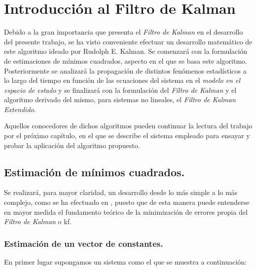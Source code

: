 \chapter{Introducción al Filtro de Kalman}

Debido a la gran importancia que presenta el \emph{Filtro de Kalman} en el desarrollo del presente trabajo, se ha visto conveniente efectuar un desarrollo matemático de este algoritmo ideado por Rudolph E. Kalman. Se comenzará con la formulación de estimaciones de mínimos cuadrados, aspecto en el que se basa este algoritmo. Posteriormente se analizará la propagación de distintos fenómenos estadísticos a lo largo del tiempo en función de las ecuaciones del sistema en el \emph{modelo en el espacio de estado} y se finalizará con la formulación del \emph{Filtro de Kalman} y el algoritmo derivado del mismo, para sistemas no lineales, el \emph{Filtro de Kalman Extendido}. \par 

Aquellos conocedores de dichos algoritmos pueden continuar la lectura del trabajo por el próximo capítulo, en el que se describe el sistema empleado para ensayar y probar la aplicación del algoritmo propuesto. \par 

\newpage
\section{Estimación de mínimos cuadrados.}

Se realizará, para mayor claridad, un desarrollo desde lo más simple a lo más complejo, como se ha efectuado en \cite{simon2006optimal}, puesto que de esta manera puede entenderse en mayor medida el fundamento teórico de la minimización de errores propia del \emph{Filtro de Kalman} o \acrshort{kf}. \par 

\subsection{Estimación de un vector de constantes.}
\noindent
En primer lugar supongamos un sistema como el que se muestra a continuación:

